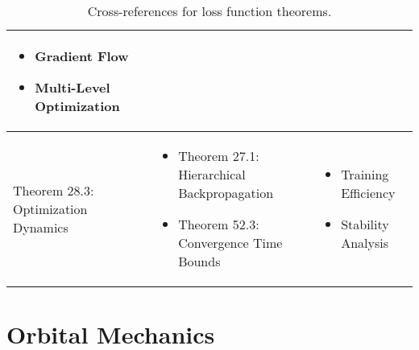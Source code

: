 \begin{table}[h]
\begin{tabular}{|l|p{7cm}|p{4cm}|}
\begin{itemize}
    \item Gradient Flow
    \item Multi-Level Optimization
\end{itemize} \\
\hline
Theorem 28.3: Optimization Dynamics &
\begin{itemize}
    \item Theorem 27.1: Hierarchical Backpropagation
    \item Theorem 52.3: Convergence Time Bounds
\end{itemize} &
\begin{itemize}
    \item Training Efficiency
    \item Stability Analysis
\end{itemize} \\
\hline
\end{tabular}
\caption{Cross-references for loss function theorems.}
\label{tab:xref_loss}
\end{table}

\section{Orbital Mechanics}

